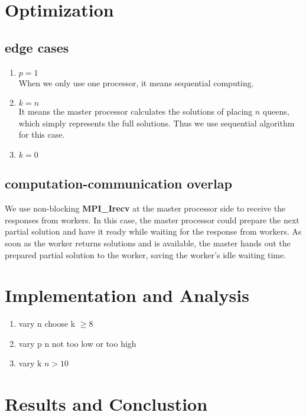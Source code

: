 \documentclass[twoside,12pt]{article}
\begin{document}
\section{Optimization}
\subsection{edge cases}
\begin{enumerate}
	\item $ p = 1 $ \\
	When we only use one processor, it means sequential computing. 
	\item $ k = n $ \\
	It means the master processor calculates the solutions of placing $ n $ queens, which simply represents the full solutions. Thus we use sequential algorithm for this case.	
	\item $ k = 0 $ \\
		
\end{enumerate}

\subsection{computation-communication overlap}
We use non-blocking \textbf{MPI\_Irecv} at the master processor side to receive the responses from workers. In this case, the master processor could prepare the next partial solution and have it ready while waiting for the response from workers. As soon as the worker returns solutions and is available, the master hands out the prepared partial solution to the worker, saving the worker's idle waiting time. 


\section{Implementation and Analysis}
\begin{enumerate}
\item vary n
choose  k $ \geq 8 $
\item vary p
n not too low or too high
\item vary k
$ n>10 $
\end{enumerate}

\section{Results and Conclustion}
     
\end{document}
